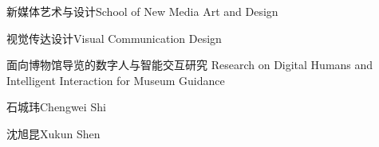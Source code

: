 
\school
{新媒体艺术与设计}{School of New Media Art and Design}

\major
{视觉传达设计}{Visual Communication Design}

\thesistitle
{面向博物馆导览的数字人与智能交互研究}
{}
{Research on Digital Humans and Intelligent Interaction for Museum Guidance}
{}

\thesisauthor
{石城玮}{Chengwei Shi}

\teacher
{沈旭昆}{Xukun Shen}




